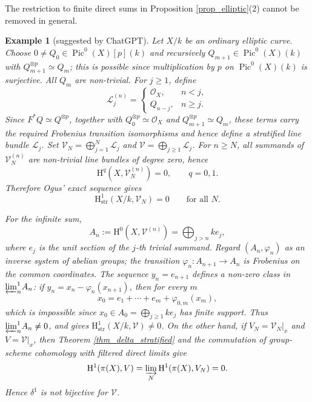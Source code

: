 \documentclass[12pt,a4]{amsart}
\newtheorem{example}[claim]{Example}
\theoremstyle{definition}
\begin{document}
The restriction to finite direct sums in Proposition \ref{prop_elliptic}(2) cannot be removed in general.

\begin{example}[suggested by ChatGPT]\label{example_ordinary_elliptic_ind}\normalfont
Let $X/k$ be an ordinary elliptic curve. Choose
$0\neq Q_0\in\operatorname{Pic}^0(X)[p](k)$ and recursively
$Q_{m+1}\in\operatorname{Pic}^0(X)(k)$ with
$Q_{m+1}^{\otimes p}\simeq Q_m$; this is possible since multiplication by
$p$ on $\operatorname{Pic}^0(X)(k)$ is surjective. All $Q_m$ are
non-trivial. For $j\geq1$, define
\[
\mathcal L_j^{(n)}=
\begin{cases}
\mathcal O_X,&n<j,\\
Q_{n-j},&n\geq j.
\end{cases}
\]
Since $F^*Q\simeq Q^{\otimes p}$, together with
$Q_0^{\otimes p}\simeq\mathcal O_X$ and
$Q_{m+1}^{\otimes p}\simeq Q_m$, these terms carry the required Frobenius
transition isomorphisms and hence define a stratified line bundle
$\mathcal L_j$. Set
$\mathcal V_N=\bigoplus_{j=1}^N\mathcal L_j$ and
$\mathcal V=\bigoplus_{j\geq1}\mathcal L_j$.
For $n\geq N$, all summands of $\mathcal V_N^{(n)}$ are non-trivial
line bundles of degree zero, hence
\[
\mathrm H^q(X,\mathcal V_N^{(n)})=0,
\qquad q=0,1.
\]
Therefore Ogus' exact sequence \cite[Theorem~2.4]{Og75} gives
\[
\mathrm H^1_{\mathrm{str}}(X/k,\mathcal V_N)=0
\qquad\text{for all }N.
\]

For the infinite sum,
\[
A_n:=\mathrm H^0(X,\mathcal V^{(n)})=\bigoplus_{j>n}ke_j,
\]
where $e_j$ is the unit section of the $j$-th trivial summand. Regard
$(A_n,\varphi_n)$ as an inverse system of abelian groups; the transition
$\varphi_n:A_{n+1}\to A_n$ is Frobenius on the common coordinates. The
sequence $y_n=e_{n+1}$ defines a non-zero class in
${\varprojlim}^{1}_nA_n$: if $y_n=x_n-\varphi_n(x_{n+1})$, then for every
$m$
\[
x_0=e_1+\cdots+e_m+\varphi_{0,m}(x_m),
\]
which is impossible since $x_0\in A_0=\bigoplus_{j\geq1}ke_j$ has finite
support. Thus ${\varprojlim}^{1}_nA_n\neq0$, and
\cite[Theorem~2.4]{Og75} gives
$\mathrm H^1_{\mathrm{str}}(X/k,\mathcal V)\neq0$.
On the other hand, if $V_N=\mathcal V_N|_x$ and $V=\mathcal V|_x$, then
Theorem \ref{thm_delta_stratified} and the commutation of group-scheme
cohomology with filtered direct limits give
\[
\mathrm H^1(\pi(X),V)
=\varinjlim_N\mathrm H^1(\pi(X),V_N)=0.
\]
Hence $\delta^1$ is not bijective for $\mathcal V$.
\end{example}
\end{document}
